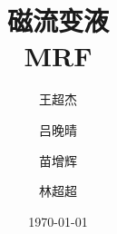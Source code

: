 \documentclass[12pt]{article}
\begin{document}
\title{ 磁流变液\\
	MRF}
\date{\today}
\author{王超杰\and 吕晚晴\and 苗增辉\and 林超超}

\maketitle

\abstract

\thispagestyle{empty}
\newpage
\tableofcontents
\thispagestyle{empty}
\newpage
\setcounter{page}{1}








\end{document}
